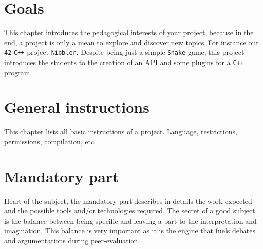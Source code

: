 \documentclass{42-en}
\begin{document}
\chapter{Goals}

    This chapter introduces the pedagogical interests of your project,
    because in the end, a project is only a mean to explore and
    discover new topics. For instance our \texttt{42} \texttt{C++}
    project \texttt{Nibbler}. Despite being just a simple
    \texttt{Snake} game, this project introduces the students to the
    creation of an API and some plugins for a \texttt{C++} program.



\chapter{General instructions}

    This chapter lists all basic instructions of a project.
    Language, restrictions, permissions, compilation, etc.



\chapter{Mandatory part}

    Heart of the subject, the mandatory part describes in details the
    work expected and the possible tools and/or technologies
    required. The secret of a good subject is the balance between
    being specific and leaving a part to the interpretation and
    imagination. This balance is very important as it is the engine
    that fuels debates and argumentations during peer-evaluation.
\end{document}
